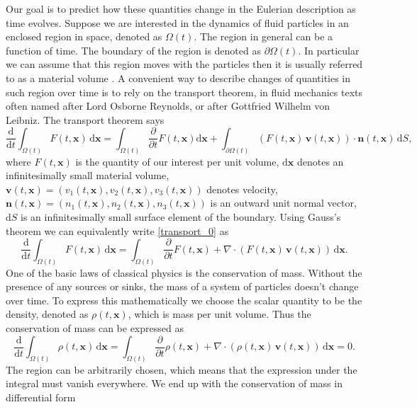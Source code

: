 \documentclass[../include.tex]{subfiles}
\begin{document}
Our goal is to predict how these quantities change in the Eulerian description as time evolves. Suppose we are interested in the dynamics of fluid particles in an enclosed region in space, denoted as $ \Omega(t) $. The region in general can be a function of time. The boundary of the region is denoted as $ \partial \Omega(t) $. In particular we can assume that this region moves with the particles then it is usually referred to as a material volume \cite{batchelor}. A convenient way to describe changes of quantities in such region over time is to rely on the transport theorem, in fluid mechanics texts often named after Lord Osborne Reynolds, or after Gottfried Wilhelm von Leibniz. The transport theorem says
\begin{equation}
	\label{transport_0}
	\frac{\mathrm{d}}{\mathrm{d}t}  \int_{\Omega(t)} F (t, \mathbf{x}) \,\mathrm{d}\mathbf{x} = 
\int_{\Omega(t)} \frac{\partial}{\partial t} F (t, \mathbf{x}) \mathrm{d}\mathbf{x} + \int_{\partial \Omega(t)} (F(t, \mathbf{x})\,\mathbf{v}(t, \mathbf{x})) \cdot \mathbf{n}(t, \mathbf{x})\,\mathrm{d}S,
\end{equation}
where $ F (t, \mathbf{x}) $ is the quantity of our interest per unit volume, $ \mathrm{d}\mathbf{x} $ denotes an infinitesimally small material volume, $ \mathbf{v}(t, \mathbf{x}) = (v_1(t, \mathbf{x}), v_2(t, \mathbf{x}), v_3(t, \mathbf{x})) $ denotes velocity, $ \mathbf{n} (t, \mathbf{x}) = (n_1(t, \mathbf{x}), n_2(t, \mathbf{x}), n_3(t, \mathbf{x})) $ is an outward unit normal vector, $ \mathrm{d}S $ is an infinitesimally small surface element of the boundary.
Using Gauss's theorem we can equivalently write \eqref{transport_0} as
\[
\frac{\mathrm{d}}{\mathrm{d}t}  \int_{\Omega(t)} F (t, \mathbf{x}) \,\mathrm{d}\mathbf{x} = 
\int_{\Omega(t)} \frac{\partial}{\partial t}  F (t, \mathbf{x}) + \nabla \cdot (F(t, \mathbf{x})\,\mathbf{v}(t, \mathbf{x}))\,\mathrm{d}\mathbf{x}.
\]
One of the basic laws of classical physics is the conservation of mass. Without the presence of any sources or sinks, the mass of a system of particles doesn't change over time. To express this mathematically we choose the scalar quantity to be the density, denoted as $ \rho(t, \mathbf{x}) $, which is mass per unit volume. Thus the conservation of mass can be expressed as
\[
\frac{\mathrm{d}}{\mathrm{d}t}  \int_{\Omega(t)} \rho (t, \mathbf{x})\,\mathrm{d}\mathbf{x} = \int_{\Omega(t)} \frac{\partial}{\partial t} \rho (t, \mathbf{x}) + \nabla \cdot (\rho(t, \mathbf{x})\,\mathbf{v}(t, \mathbf{x}))\,\mathrm{d}\mathbf{x} = 0.
\]
The region can be arbitrarily chosen, which means that the expression under the integral must vanish everywhere. We end up with the conservation of mass in differential form
\end{document}
